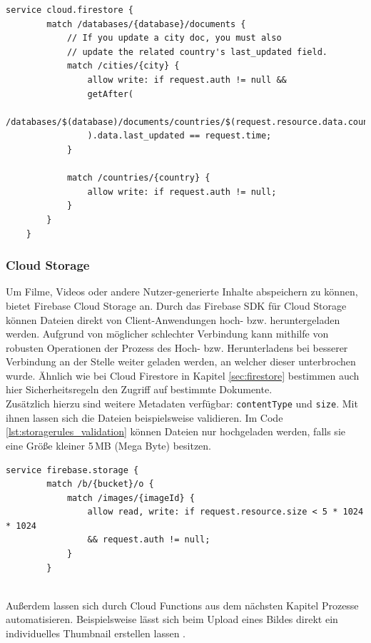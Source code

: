 \begin{lstlisting}[caption=Datenvalidierung für atomare Operationen, label=lst:firestorerules_validation]
	service cloud.firestore {
		match /databases/{database}/documents {
			// If you update a city doc, you must also
			// update the related country's last_updated field.
			match /cities/{city} {
				allow write: if request.auth != null &&
				getAfter(
				/databases/$(database)/documents/countries/$(request.resource.data.country)
				).data.last_updated == request.time;
			}
			
			match /countries/{country} {
				allow write: if request.auth != null;
			}
		}
	}
\end{lstlisting}

\subsubsection{Cloud Storage}
\label{sec:firebase_storage}
Um Filme, Videos oder andere Nutzer-generierte Inhalte abspeichern zu können, bietet Firebase Cloud Storage an. 
Durch das Firebase SDK für Cloud Storage können Dateien direkt von Client-Anwendungen hoch- bzw. heruntergeladen werden.
Aufgrund von möglicher schlechter Verbindung kann mithilfe von robusten Operationen der Prozess des Hoch- bzw. Herunterladens bei besserer Verbindung an der Stelle weiter geladen werden, an welcher dieser unterbrochen wurde.
Ähnlich wie bei Cloud Firestore in Kapitel \ref{sec:firestore} bestimmen auch hier Sicherheitsregeln den Zugriff auf bestimmte Dokumente.\\
Zusätzlich hierzu sind weitere Metadaten verfügbar: \texttt{contentType} und \texttt{size}. 
Mit ihnen lassen sich die Dateien beispielsweise validieren.
Im Code \ref{lst:storagerules_validation} können Dateien nur hochgeladen werden, falls sie eine Größe kleiner 5\,MB (Mega Byte) besitzen.\\

\begin{lstlisting}[caption=Validierung nach Dateigröße, label=lst:storagerules_validation]
	service firebase.storage {
		match /b/{bucket}/o {
			match /images/{imageId} {
				allow read, write: if request.resource.size < 5 * 1024 * 1024
				&& request.auth != null;
			}
		}
		
\end{lstlisting}

Außerdem lassen sich durch Cloud Functions aus dem nächsten Kapitel Prozesse automatisieren. Beispielsweise lässt sich beim Upload eines Bildes direkt ein individuelles Thumbnail erstellen lassen \cite{firebase2021}.
